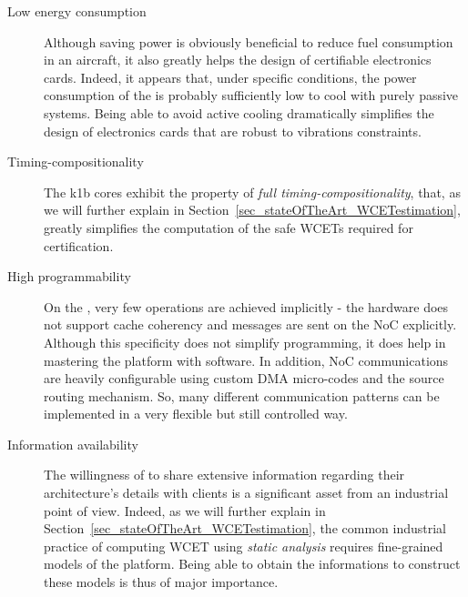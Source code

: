 \documentclass[main.tex]{subfiles}
\begin{document}
\begin{description}
    \item[Low energy consumption]
        Although saving power is obviously beneficial to reduce fuel
        consumption in an aircraft, it also greatly helps the design of
        certifiable electronics cards. Indeed, it appears that, under specific
        conditions, the power consumption of the \mppalong is probably
        sufficiently low to cool with purely passive systems. Being able to
        avoid active cooling dramatically simplifies the design of electronics
        cards that are robust to vibrations constraints.

    \item[Timing-compositionality]
        The k1b cores exhibit the property of \emph{full
        timing-compositionality}, that, as we will further explain in
        Section~\ref{sec_stateOfTheArt_WCETestimation}, greatly simplifies the
        computation of the safe WCETs required for certification.

    \item[High programmability]
        On the \mppalong, very few operations are achieved implicitly - the
        hardware does not support cache coherency and messages are sent on the
        NoC explicitly. Although this specificity does not simplify
        programming, it does help in mastering the platform with software. In
        addition, NoC communications are heavily configurable using custom DMA
        micro-codes and the source routing mechanism. So, many different
        communication patterns can be implemented in a very flexible but still
        controlled way.

    \item[Information availability]
        The willingness of \kalray to share extensive information regarding
        their architecture's details with clients is a significant asset from
        an industrial point of view. Indeed, as we will further explain in
        Section~\ref{sec_stateOfTheArt_WCETestimation}, the common industrial
        practice of computing WCET using \emph{static analysis} requires
        fine-grained models of the platform. Being able to obtain the
        informations to construct these models is thus of major importance.
\end{description}
\end{document}
